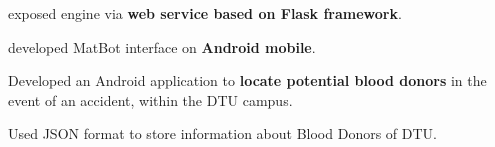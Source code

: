 \documentclass[a4paper]{deedy-resume-openfont}
\begin{document}
\begin{minipage}[t]{0.66\textwidth}
\begin{tightemize}
 \item exposed engine via \textbf{web service based on Flask framework}.
 \item developed MatBot interface on \textbf{Android mobile}.
\end{tightemize}
\sectionsep
%
\begin{tightemize}
 \item Developed an Android application to \textbf{ locate potential blood donors} in the event of an accident, within the DTU campus.
 \item Used JSON format to store information about Blood Donors of DTU.
\end{tightemize}
\sectionsep





%
%

\end{minipage} 
\end{document}
